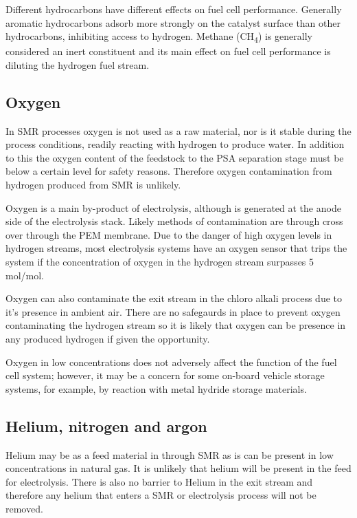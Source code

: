 Different hydrocarbons have different effects on fuel cell performance. Generally aromatic hydrocarbons adsorb more strongly on the catalyst surface than other hydrocarbons, inhibiting access to hydrogen.\cite{InternationalStandardISO14687-2:20122012} Methane (CH\textsubscript{4}) is generally considered an inert constituent and its main effect on fuel cell performance is diluting the hydrogen fuel stream. \cite{InternationalStandardISO14687-2:20122012}

\subsection*{Oxygen}
In SMR processes oxygen is not used as a raw material, nor is it stable during the process conditions, readily reacting with hydrogen to produce water. In addition to this the oxygen content of the feedstock to the PSA separation stage must be below a certain level for safety reasons. Therefore oxygen contamination from hydrogen produced from SMR is unlikely. 

Oxygen is a main by-product of electrolysis, although is generated at the anode side of the electrolysis stack. Likely methods of contamination are through cross over through the PEM membrane. Due to the danger of high oxygen levels in hydrogen streams, most electrolysis systems have an oxygen sensor that trips the system if the concentration of oxygen in the hydrogen stream surpasses 5 \textmu mol/mol. \cite{Bacquart2018}

Oxygen can also contaminate the exit stream in the chloro alkali process due to it's presence in ambient air. There are no safegaurds in place to prevent oxygen contaminating the hydrogen stream so it is likely that oxygen can be presence in any produced hydrogen if given the opportunity.\cite{Bacquart2018} 

Oxygen in low concentrations does not adversely affect the function of the fuel cell system; however, it may be a concern for some on-board vehicle storage systems, for example, by reaction with metal hydride storage materials. \cite{InternationalStandardISO14687-2:20122012} 

\subsection*{Helium, nitrogen and argon}
Helium may be as a feed material in through SMR as is can be present in low concentrations in natural gas. It is unlikely that helium will be present in the feed for electrolysis. There is also no barrier to Helium in the exit stream and therefore any helium that enters a SMR or electrolysis process will not be removed. 

